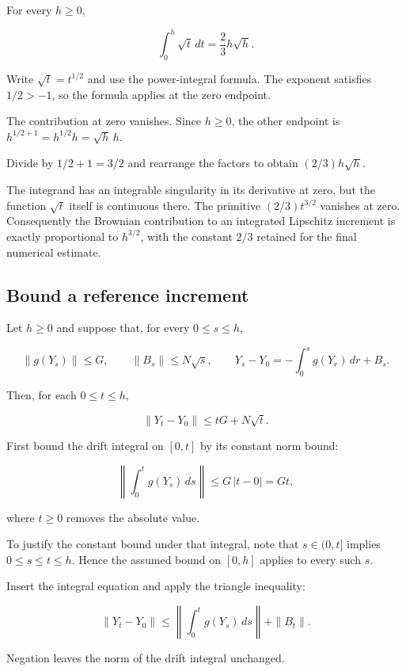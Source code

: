 \documentclass[11pt,a4paper]{article}
\begin{document}
For every \(h\ge0\),

\[\int_0^h\sqrt t\,dt=\frac23h\sqrt h.\]

Write \(\sqrt t=t^{1/2}\) and use the power-integral formula. The exponent satisfies \(1/2>-1\), so the formula applies at the zero endpoint.



The contribution at zero vanishes. Since \(h\ge0\), the other endpoint is \(h^{1/2+1}=h^{1/2}h=\sqrt h\,h\).



Divide by \(1/2+1=3/2\) and rearrange the factors to obtain \((2/3)h\sqrt h\).



The integrand has an integrable singularity in its derivative at zero, but the function \(\sqrt t\) itself is continuous there. The primitive \((2/3)t^{3/2}\) vanishes at zero. Consequently the Brownian contribution to an integrated Lipschitz increment is exactly proportional to \(h^{3/2}\), with the constant \(2/3\) retained for the final numerical estimate.


\subsection{\texorpdfstring{Bound a reference increment}{Bound a reference increment}}


Let \(h\ge0\) and suppose that, for every \(0\le s\le h\),

\[\|g(Y_s)\|\le G,\qquad \|B_s\|\le N\sqrt s,\qquad Y_s-Y_0=-\int_0^s g(Y_r)\,dr+B_s.\]

Then, for each \(0\le t\le h\),

\[\|Y_t-Y_0\|\le tG+N\sqrt t.\]

First bound the drift integral on \([0,t]\) by its constant norm bound:

\[\left\|\int_0^t g(Y_s)\,ds\right\|\le G\,|t-0|=Gt,\]

where \(t\ge0\) removes the absolute value.



To justify the constant bound under that integral, note that \(s\in(0,t]\) implies \(0\le s\le t\le h\). Hence the assumed bound on \([0,h]\) applies to every such \(s\).



Insert the integral equation and apply the triangle inequality:

\[\|Y_t-Y_0\|\le\left\|\int_0^t g(Y_s)\,ds\right\|+\|B_t\|.\]

Negation leaves the norm of the drift integral unchanged.
\end{document}
